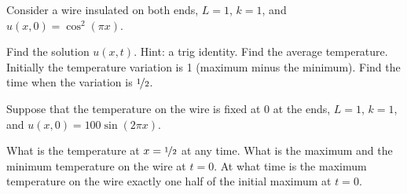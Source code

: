 \begin{exercise}
Consider a wire insulated on both ends, $L=1$, $k=1$,
and $u(x,0) = \cos^2(\pi x)$.
\begin{tasks}
\task
Find the solution $u(x,t)$.  Hint: a trig identity.
\task
Find the average temperature.
\task
Initially the temperature variation is 1 (maximum minus the minimum).
Find the time when the variation is $\nicefrac{1}{2}$.
\end{tasks}
\end{exercise}

\begin{exercise}\ansMark%
Suppose that the temperature on the wire is fixed at $0$
at the ends, $L=1$, $k=1$, and $u(x,0) = 100\sin(2 \pi x)$.
\begin{tasks}
\task
What is the temperature at $x = \nicefrac{1}{2}$ at any time.
\task
What is the maximum and the minimum temperature on the wire
at $t=0$.
\task
At what time is the maximum temperature on the wire exactly
one half of the initial maximum at $t=0$.
\end{tasks}
\end{exercise}

\setcounter{exercise}{100}




